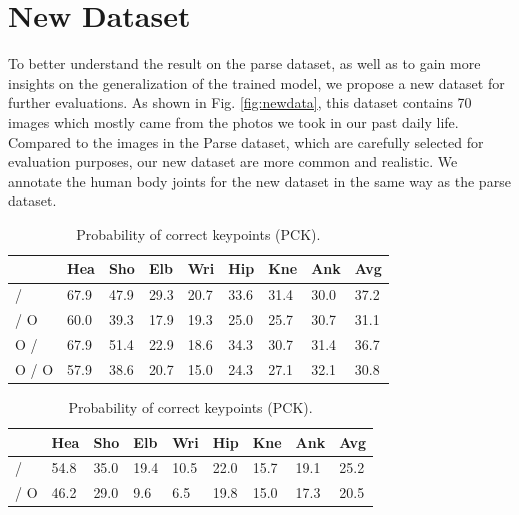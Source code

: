 \documentclass[10pt,twocolumn,letterpaper]{article}
\begin{document}
\section{New Dataset}
\label{sec:newdata}

To better understand the result on the parse dataset, as well as to gain more insights on the generalization of the trained model, we propose a new dataset for further evaluations. As shown in Fig. \ref{fig:newdata}, this dataset contains 70 images which mostly came from the photos we took in our past daily life. Compared to the images in the Parse dataset, which are carefully selected for evaluation purposes, our new dataset are more common and realistic. We annotate the human body joints for the new dataset in the same way as the parse dataset. 

\begin{table}[t]
  \begin{center}
    \begin{tabular}{|p{1.1cm}|p{0.5cm}|p{0.5cm}|p{0.5cm}|p{0.5cm}|p{0.5cm}|p{0.5cm}|p{0.5cm}||p{0.5cm}|}
      \hline
      		            	                         & Hea  & Sho  & Elb  & Wri  & Hip  & Kne  & Ank  & Avg  \\ \hline
      \hline
      \cite{Yang_PAMI2011} / \cite{Yang_PAMI2011} 	 & 67.9 & 47.9 & 29.3 & 20.7 & 33.6 & 31.4 & 30.0 & 37.2 \\ \hline
      \cite{Yang_PAMI2011} / O                   	 & 60.0 & 39.3 & 17.9 & 19.3 & 25.0 & 25.7 & 30.7 & 31.1 \\ \hline
      O / \cite{Yang_PAMI2011}			 	 & 67.9 & 51.4 & 22.9 & 18.6 & 34.3 & 30.7 & 31.4 & 36.7 \\ \hline
      O / O			 		 	 & 57.9 & 38.6 & 20.7 & 15.0 & 24.3 & 27.1 & 32.1 & 30.8 \\ \hline
    \end{tabular}
    \caption*{Probability of correct keypoints (PCK).}
    \bigskip
    \begin{tabular}{|p{1.1cm}|p{0.5cm}|p{0.5cm}|p{0.5cm}|p{0.5cm}|p{0.5cm}|p{0.5cm}|p{0.5cm}||p{0.5cm}|}
      \hline
      		                                         & Hea  & Sho  & Elb  & Wri  & Hip  & Kne  & Ank  & Avg \\ \hline
      \hline
      \cite{Yang_PAMI2011} / \cite{Yang_PAMI2011}	 & 54.8 & 35.0 & 19.4 & 10.5 & 22.0 & 15.7 & 19.1 & 25.2 \\ \hline
      \cite{Yang_PAMI2011} / O                   	 & 46.2 & 29.0 &  9.6 &  6.5 & 19.8 & 15.0 & 17.3 & 20.5 \\ \hline

\end{tabular}
\end{center}
\end{table}
\end{document}
